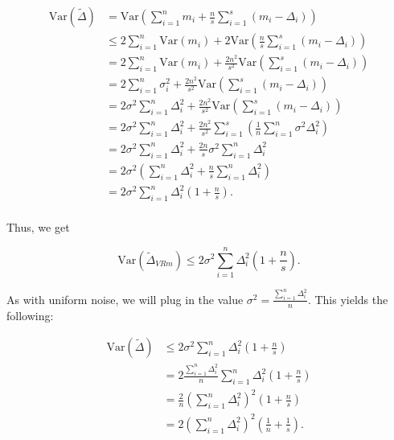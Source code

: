 \documentclass[11pt, margin=1in]{article}
\begin{document}
\[
\begin{aligned}
\mathrm{Var}\left(\tilde{\Delta}\right) &= \mathrm{Var}\left( \sum_{i = 1}^{n} m_i + \frac{n}{s} \sum_{i = 1}^{s} \left(m_i - \Delta_i\right)\right) \\
&\leq 2\sum_{i = 1}^{n} \mathrm{Var}\left(m_i\right) + 2\mathrm{Var}\left(\frac{n}{s} \sum_{i = 1}^{s} \left(m_i - \Delta_i\right)\right) \\
&= 2\sum_{i = 1}^{n} \mathrm{Var}\left(m_i\right) + \frac{2n^2}{s^2} \mathrm{Var}\left(\sum_{i = 1}^{s} \left(m_i - \Delta_i\right)\right) \\
&= 2\sum_{i = 1}^{n} \sigma_i^2 + \frac{2n^2}{s^2} \mathrm{Var}\left(\sum_{i = 1}^{s} \left(m_i - \Delta_i\right)\right) \\
&= 2\sigma^2\sum_{i = 1}^{n} \Delta_i^2 + \frac{2n^2}{s^2} \mathrm{Var}\left(\sum_{i = 1}^{s} \left(m_i - \Delta_i\right)\right) \\
&= 2\sigma^2\sum_{i = 1}^{n} \Delta_i^2 + \frac{2n^2}{s^2}\sum_{i = 1}^{s} \left(\frac{1}{n}\sum_{i = 1}^{n}\sigma^2\Delta_i^2\right) \\
&= 2\sigma^2\sum_{i = 1}^{n} \Delta_i^2 + \frac{2n}{s}\sigma^2\sum_{i = 1}^{n}\Delta_i^2 \\
&= 2\sigma^2\left(\sum_{i = 1}^{n} \Delta_i^2 + \frac{n}{s}\sum_{i = 1}^{n}\Delta_i^2\right) \\
&= 2\sigma^2\sum_{i = 1}^{n} \Delta_i^2\left(1 + \frac{n}{s}\right). \\
\end{aligned}
\]

Thus, we get

\begin{equation}
    \mathrm{Var}\left(\tilde{\Delta}_{VRm}\right) \leq 2\sigma^2\sum_{i = 1}^{n} \Delta_i^2\left(1 + \frac{n}{s}\right).
\label{eq:Var_Delta_VRm}
\end{equation}

As with uniform noise, we will plug in the value $\sigma^2 = \frac{\sum_{i = 1}^{n}\Delta_i^2}{n}$.
This yields the following:

\[
\begin{aligned}
\mathrm{Var}\left(\tilde{\Delta}\right) &\leq 2\sigma^2\sum_{i = 1}^{n} \Delta_i^2\left(1 + \frac{n}{s}\right) \\
&= 2\frac{\sum_{i = 1}^{n}\Delta_i^2}{n}\sum_{i = 1}^{n} \Delta_i^2\left(1 + \frac{n}{s}\right) \\
&= \frac{2}{n}\left(\sum_{i = 1}^{n}\Delta_i^2\right)^2\left(1 + \frac{n}{s}\right) \\
&= 2\left(\sum_{i = 1}^{n}\Delta_i^2\right)^2\left(\frac{1}{n} + \frac{1}{s}\right). \\
\end{aligned}
\]
\end{document}
